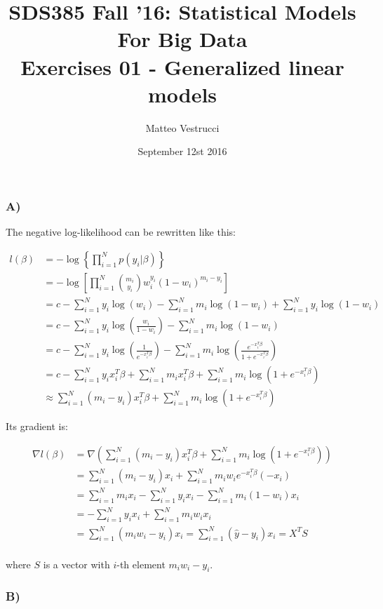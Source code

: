 \documentclass{article}
\title{SDS385 Fall '16: Statistical Models For Big Data\\Exercises 01 - Generalized linear models}
\author{Matteo Vestrucci}
\date{September 12st 2016}
\begin{document}
\maketitle
\bigskip\bigskip\bigskip

\subsubsection*{A)}

The negative log-likelihood can be rewritten like this:

\begin{align*}
l(\beta)&=-\log\left\lbrace\prod_{i=1}^N p(y_i|\beta)\right\rbrace\\
		&=-\log\left[\prod_{i=1}^N \binom{m_i}{y_i}w_i^{y_i}(1-w_i)^{m_i-y_i}\right]\\
		&= c-\sum_{i=1}^N y_i \log(w_i)-\sum_{i=1}^N m_i \log(1-w_i)+\sum_{i=1}^N y_i \log(1-w_i)\\
		&= c-\sum_{i=1}^N y_i \log\left(\frac{w_i}{1-w_i}\right)-\sum_{i=1}^N m_i \log(1-w_i)\\
		&= c-\sum_{i=1}^N y_i \log\left(\frac{1}{e^{-x_i^T\beta}}\right)-\sum_{i=1}^N m_i \log\left(\frac{e^{-x_i^T\beta}}{1+e^{-x_i^T\beta}}\right)\\
		&= c-\sum_{i=1}^N y_i x_i^T\beta+\sum_{i=1}^N m_i x_i^T\beta+\sum_{i=1}^N m_i \log(1+e^{-x_i^T\beta})\\
		&\approx\sum_{i=1}^N (m_i-y_i) x_i^T\beta+\sum_{i=1}^N m_i \log(1+e^{-x_i^T\beta})
\end{align*}

\newpage

Its gradient is:

\begin{align*}
\nabla l(\beta)&=\nabla\left(\sum_{i=1}^N (m_i-y_i) x_i^T\beta+\sum_{i=1}^N m_i \log(1+e^{-x_i^T\beta})\right)\\
				&=\sum_{i=1}^N (m_i-y_i) x_i+\sum_{i=1}^N m_i w_i e^{-x_i^T\beta}(-x_i)\\
				&=\sum_{i=1}^N m_i x_i-\sum_{i=1}^N y_i x_i-\sum_{i=1}^N m_i (1-w_i) x_i\\
				&=-\sum_{i=1}^N y_i x_i+\sum_{i=1}^N m_i w_i x_i\\
				&=\sum_{i=1}^N (m_i w_i-y_i)x_i=\sum_{i=1}^N (\hat{y}-y_i)x_i=X^TS\\
\end{align*}

where $S$ is a vector with $i$-th element $m_i w_i-y_i$.

\subsubsection*{B)}
\end{document}
